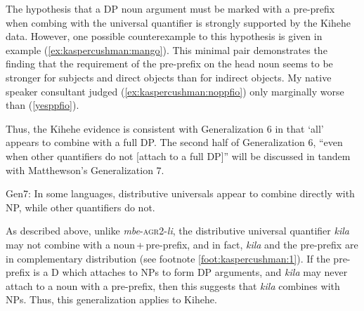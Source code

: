 \documentclass[output=paper,modfonts,nonflat]{langsci/langscibook}
\begin{document}
The hypothesis that a DP noun argument must be marked with a pre-prefix when combing with the universal quantifier is strongly supported by the Kihehe data.  However, one possible counterexample to this hypothesis is given in example (\ref{ex:kaspercushman:mango}). This minimal pair demonstrates the finding that the requirement of the pre-prefix on the head noun seems to be stronger for subjects and direct objects than for indirect objects.  My native speaker consultant judged (\ref{ex:kaspercushman:noppfio}) only marginally worse than (\ref{yesppfio}). 

\begin{exe} 
\ex  \label{ex:kaspercushman:mango} \begin{xlist}

\end{xlist}
\end{exe}

Thus, the Kihehe evidence is consistent with Generalization 6 in that `all' appears to combine with a full DP.  The second half of Generalization 6, ``even when other quantifiers do not [attach to a full DP]'' will be discussed in tandem with Matthewson's Generalization 7. 


\begin{exe}
\ex Gen7: In some languages, distributive universals appear to combine directly with NP, while other quantifiers do not. \citep[36]{Matthewson2013} 
\end{exe}

As described above, unlike \textit{mbe}-\textsc{agr2}-\textit{li}, the distributive universal quantifier \textit{kila} may not combine with a noun\,+\,pre-prefix, and in fact, \textit{kila} and the pre-prefix are in complementary distribution (see footnote \ref{foot:kaspercushman:1}). If the pre-prefix is a D which attaches to NPs to form DP arguments, and \textit{kila} may never attach to a noun with a pre-prefix, then this suggests that \textit{kila} combines with NPs. Thus, this generalization applies to Kihehe. 
\end{document}
